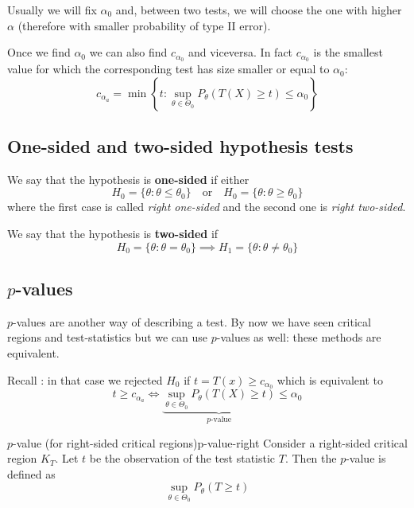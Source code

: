 \documentclass[12pt]{extarticle}
\begin{document}
Usually we will fix $\alpha_0$ and, between two tests, we will choose the one with higher $\alpha$ (therefore with smaller probability of type II error).

Once we find $\alpha_0$ we can also find $c_{\alpha_0}$ and viceversa.
In fact $c_{\alpha_0}$ is the smallest value for which the corresponding test has size smaller or equal to $\alpha_0$:
\begin{equation}
	c_{\alpha_a} = \min \left\{ t : \sup_{\theta \in \Theta_0} P_\theta (T(X)\geq t) \leq \alpha_0 \right\}
	\label{eq:def-c0}
\end{equation}

\subsection{One-sided and two-sided hypothesis tests}

We say that the hypothesis is \textbf{one-sided} if either
\begin{equation}
	H_0 = \{\theta : \theta \leq \theta_0\} \quad \text{or} \quad H_0 = \{\theta : \theta \geq \theta_0\}
\end{equation}
where the first case is called \emph{right one-sided} and the second one is \emph{right two-sided}.

We say that the hypothesis is \textbf{two-sided} if
\begin{equation}
	H_0 = \{ \theta: \theta = \theta_0 \} \implies H_1 = \{ \theta : \theta \ne \theta_0 \}
\end{equation}

\subsection{\texorpdfstring{$p$}{p}-values}

$p$-values are another way of describing a test.
By now we have seen critical regions and test-statistics but we can use $p$-values as well: these methods are equivalent.

Recall : in that case we rejected $H_0$ if $t = T(x) \geq c_{\alpha_0}$ which is equivalent to
\begin{equation}
	t \geq c_{\alpha_a} \iff \underbrace{\sup_{\theta \in \Theta_0} P_\theta (T(X)\geq t)}_{p\text{-value}} \leq \alpha_0
\end{equation}

\begin{definition}{$p$-value (for right-sided critical regions)}{p-value-right}
	Consider a right-sided critical region $K_T$.
	Let $t$ be the observation of the test statistic $T$.
	Then the $p$-value is defined as
	\begin{equation}
		\sup_{\theta \in \Theta_0} P_\theta(T \geq t)
	\end{equation}
\end{definition}
\end{document}
